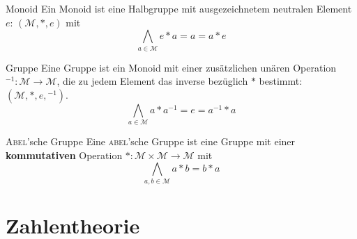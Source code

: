 \documentclass[]{beamer}
\begin{document}
\begin{frame}[squeeze]{}
  \vspace*{-0.25em}
  \begin{block}{Monoid}
    Ein Monoid ist eine Halbgruppe mit ausgezeichnetem neutralen Element $e$: $(\mathcal{M}, *, e)$ mit \vspace*{-0.25em}
      \[\bigwedge_{a \in \mathcal{M}} e * a = a = a * e\]
  \end{block}
  \vspace*{-0.5em}
  \pause
  
  \begin{block}{Gruppe}
    Eine Gruppe ist ein Monoid mit einer zusätzlichen unären Operation $\text{}^{-1}\colon \mathcal{M} \to \mathcal{M}$, die zu jedem Element das inverse bezüglich $\ast$ bestimmt: $\left( \mathcal{M}, \ast, e, \text{}^{-1} \right)$. \vspace*{-0.25em}
    \[\bigwedge_{a \in \mathcal{M}} a \ast a^{-1} = e = a^{-1} \ast a\]
  \end{block}
  \vspace*{-0.5em}
  
  \pause
  
  \begin{block}{\textsc{Abel}'sche Gruppe}
    Eine \textsc{abel}'sche Gruppe ist eine Gruppe mit einer \textbf{kommutativen} Operation $\ast\colon \mathcal{M} \times \mathcal{M} \to \mathcal{M}$ mit \vspace*{-0.25em}
    \[\bigwedge_{a, b \in \mathcal{M}} a \ast b = b \ast a\]
  \end{block}
\end{frame}

\section{Zahlentheorie}
\end{document}
